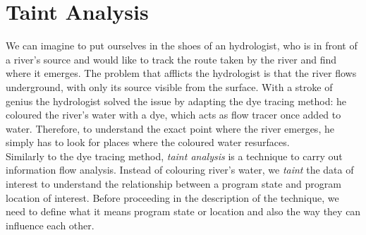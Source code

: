 \documentclass[LaM,binding=0.6cm]{sapthesis}
\begin{document}
\section{Taint Analysis}
\label{sec:taintanalysis}
We can imagine to put ourselves in the shoes of an hydrologist, who is in front of a river's source and would like to track the route taken by the river and find where it emerges. The problem that afflicts the hydrologist is that the river flows underground, with only its source visible from the surface. With a stroke of genius the hydrologist solved the issue by adapting the dye tracing method: he coloured the river's water with a dye, which acts as flow tracer once added to water. Therefore, to understand the exact point where the river emerges, he simply has to look for places where the coloured water resurfaces.\\

Similarly to the dye tracing method, \textit{taint analysis} is a technique to carry out information flow analysis. Instead of colouring river's water, we \textit{taint} the data of interest to understand the relationship between a program state and program location of interest\cite{Practicalbinaryanalysis}. Before proceeding in the description of the technique, we need to define what it means program state or location and also the way they can influence each other.\\
\end{document}
